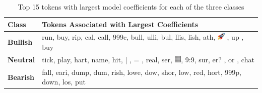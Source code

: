 \begin{table}[!ht]
	\centering

	\begin{tabular}{ll}
\toprule
\textbf{Class} & \textbf{Tokens Associated with Largest Coefficients}\\
\midrule
\textbf{Bullish} & run, buy,  rip,  cal, call, 999c, bull, ulli,  bul, llis, lish,  ath,  \includegraphics[height=1em]{assets/images/emoji_rocket.png} ,  up ,  buy \\
\textbf{Neutral} & tick, play, hart, name,  hit,  | ,  = , real,  ser, \includegraphics[height=0.9em]{assets/images/unicode_lightshade.png},  9:9,  sur, er? ,  or , chat \\
\textbf{Bearish} &fall, eari, dump,  dum, rish, lowe,  dow, shor,  low,  red, hort, 999p, down,  los,  put \\
\bottomrule
	\end{tabular}
	\caption{Top 15 tokens with largest model coefficients for each of the three classes}
	\label{table-top-tokens-per-class}
\end{table}